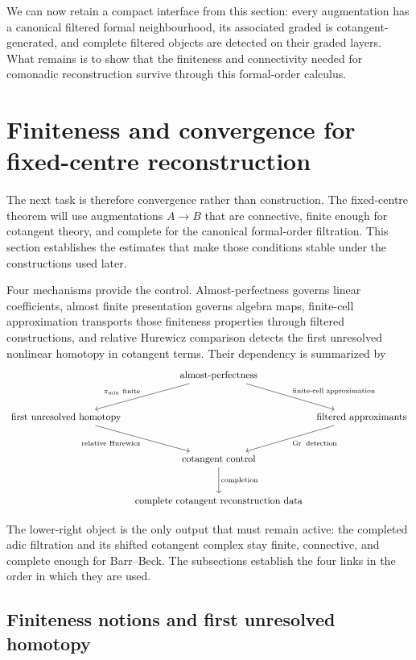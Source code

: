 We can now retain a compact interface from this section: every augmentation has a
canonical filtered formal neighbourhood, its associated graded is cotangent-generated,
and complete filtered objects are detected on their graded layers. What remains is to
show that the finiteness and connectivity needed for comonadic reconstruction survive
through this formal-order calculus.

\section{Finiteness and convergence for fixed-centre reconstruction}
\label{sec:formal-reconstruction-finiteness}

The next task is therefore convergence rather than construction. The fixed-centre
theorem will use augmentations \(A\to B\) that are connective, finite enough for
cotangent theory, and complete for the canonical formal-order filtration. This section
establishes the estimates that make those conditions stable under the constructions used
later.

Four mechanisms provide the control. Almost-perfectness governs linear coefficients,
almost finite presentation governs algebra maps, finite-cell approximation transports
those finiteness properties through filtered constructions, and relative Hurewicz
comparison detects the first unresolved nonlinear homotopy in cotangent terms. Their
dependency is summarized by
\[
\begin{tikzcd}[column sep=tiny,row sep=large]
    & \text{almost-perfectness} 
        \arrow[dr,"\text{finite-cell approximation}"]
        \arrow[dl,"\pi_{\min}\ \text{finite}"']
    & 
    \\
    \text{first unresolved homotopy} 
        \arrow[dr,"\text{relative Hurewicz}"']
    &   
    & \text{filtered approximants}
        \arrow[dl,"\operatorname{Gr}\ \text{detection}"]
    \\
    & \text{cotangent control} 
        \arrow[d,"\text{completion}"]
    &  
    \\
    & \text{complete cotangent reconstruction data} &
\end{tikzcd}
\]


The lower-right object is the only output that must remain active: the completed adic
filtration and its shifted cotangent complex stay finite, connective, and complete
enough for Barr--Beck. The subsections establish the four links in the order in which
they are used.

\subsection{Finiteness notions and first unresolved homotopy}

